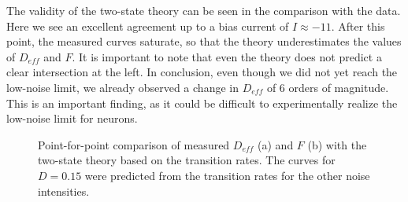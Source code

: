\documentclass[12pt,a4paper]{article}
\begin{document}
The validity of the two-state theory can be seen in the comparison with the data. Here we see an excellent agreement up to a bias current of $I\approx-11$. After this point, the measured curves saturate, so that the theory underestimates the values of $D_{eff}$ and $F$. It is important to note that even the theory does not predict a clear intersection at the left. In conclusion, even though we did not yet reach the low-noise limit, we already observed a change in $D_{eff}$ of 6 orders of magnitude. This is an important finding, as it could be difficult to experimentally realize the low-noise limit for neurons.
\begin{figure}[H]
	\hspace*{-0.5cm}
	\caption{Point-for-point comparison of measured $D_{eff}$ (a) and $F$ (b) with the two-state theory based on the transition rates. The curves for $D=0.15$ were predicted from the transition rates for the other noise intensities.}
\end{figure}
\end{document}
